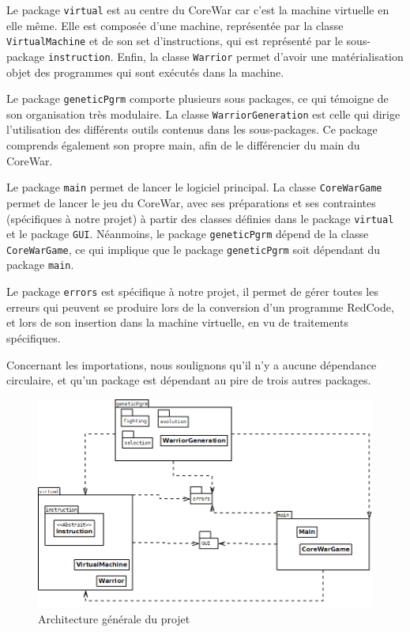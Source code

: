 \documentclass[hidelinks]{report}
\begin{document}
Le package \texttt{virtual} est au centre du CoreWar car c'est la machine virtuelle en elle même. Elle est composée d'une machine, représentée par la classe \texttt{VirtualMachine} et de son set d'instructions, qui est représenté par le sous-package \texttt{instruction}. Enfin, la classe \texttt{Warrior} permet d'avoir une matérialisation objet des programmes qui sont exécutés dans la machine.

Le package \texttt{geneticPgrm} comporte plusieurs sous packages, ce qui témoigne de son organisation très modulaire. La classe \texttt{WarriorGeneration} est celle qui dirige l'utilisation des différents outils contenus dans les sous-packages. Ce package comprends également son propre main, afin de le différencier du main du CoreWar.

Le package \texttt{main} permet de lancer le logiciel principal. La classe \texttt{CoreWarGame} permet de lancer le jeu du CoreWar, avec ses préparations et ses contraintes (spécifiques à notre projet) à partir des classes définies dans le package \texttt{virtual} et le package \texttt{GUI}. Néanmoins, le package \texttt{geneticPgrm} dépend de la classe \texttt{CoreWarGame}, ce qui implique que le package \texttt{geneticPgrm} soit dépendant du package \texttt{main}.

Le package \texttt{errors} est spécifique à notre projet, il permet de gérer toutes les erreurs qui peuvent se produire lors de la conversion d'un programme RedCode, et lors de son insertion dans la machine virtuelle, en vu de traitements spécifiques.

Concernant les importations, nous soulignons qu'il n'y a aucune dépendance circulaire, et qu'un package est dépendant au pire de trois autres packages.
\begin{figure}[H]
    \centering
    \includegraphics[scale=0.6]{images/diagrammes/archi_gn.png}
    \caption{Architecture générale du projet}
    \label{fig:archiGN}
\end{figure}
\end{document}
